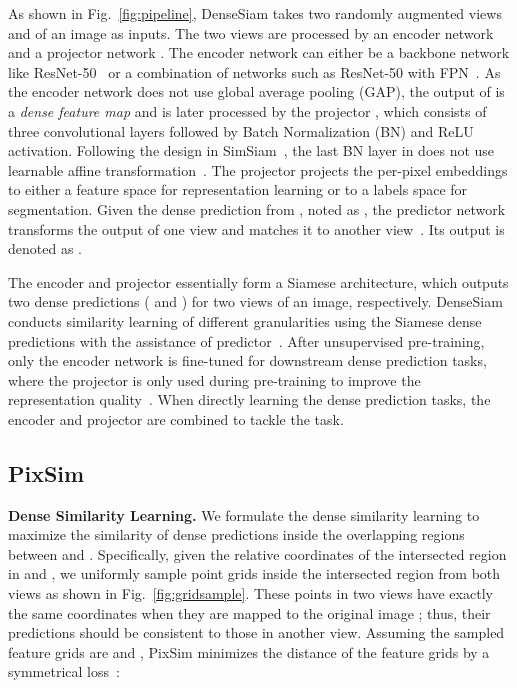 \documentclass[runningheads]{llncs}
\newcommand{\myparagraph}[1]{{\noindent\bf #1}}
\begin{document}
As shown in Fig.~\ref{fig:pipeline}, DenseSiam takes two randomly augmented views  and  of an image  as inputs.
The two views are processed by an encoder network  and a projector network .
The encoder network can either be a backbone network like ResNet-50~\cite{resnet} or a combination of networks such as ResNet-50 with FPN~\cite{fpn}.
As the encoder network  does not use global average pooling (GAP), 
the output of  is a \emph{dense feature map} and is later processed by the projector , which consists of three  convolutional layers followed by Batch Normalization (BN) and ReLU activation.
Following the design in SimSiam~\cite{simsiam}, the last BN layer in  does not use learnable affine transformation~\cite{BN}.
The projector  projects the per-pixel embeddings to either a feature space for representation learning or to a labels space for segmentation.
Given the dense prediction from , noted as , the predictor network  transforms the output of one view and matches it to another view~\cite{simsiam}.
Its output is denoted as .

The encoder and projector essentially form a Siamese architecture, which outputs two dense predictions ( and ) for two views of an image, respectively.
DenseSiam conducts similarity learning of different granularities using the Siamese dense predictions with the assistance of predictor~\cite{simsiam, byol}.
After unsupervised pre-training, only the encoder network is fine-tuned for downstream dense prediction tasks, where the projector is only used during pre-training to improve the representation quality~\cite{simclr}.
When directly learning the dense prediction tasks, the encoder and projector are combined to tackle the task.


\subsection{PixSim}\label{sec:pixsim}

\myparagraph{Dense Similarity Learning.}
We formulate the dense similarity learning to maximize the similarity of dense predictions inside the overlapping regions between  and .
Specifically, given the relative coordinates of the intersected region in  and ,
we uniformly sample  point grids inside the intersected region from both views as shown in Fig.~\ref{fig:gridsample}.
These points in two views have exactly the same coordinates when they are mapped to the original image ;
thus, their predictions should be consistent to those in another view.
Assuming the sampled feature grids are  and , PixSim
minimizes the distance of the feature grids by a symmetrical loss~\cite{byol, simsiam}:
\newcommand{\lnorm}[1]{\frac{#1}{\left\lVert{#1}\right\rVert _2}}
\newcommand{\lnormv}[1]{{#1}/{\left\lVert{#1}\right\rVert _2}}
\newcommand{\logsoftmax}[1]{\log\texttt{softmax}({#1})}
\newcommand{\softmax}[1]{\texttt{softmax}({#1})}
\end{document}
